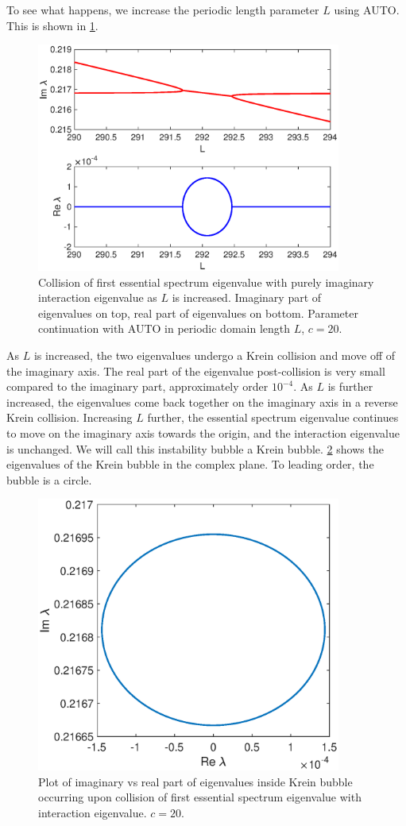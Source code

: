 \documentclass[thesis2.tex]{subfiles}
\begin{document}
To see what happens, we increase the periodic length parameter $L$ using AUTO. This is shown in \cref{fig:kreinbubble1}.
\begin{figure}
\includegraphics[width=10cm]{images/kdv5numerics/kreinbubble1}
\caption[Eigenvalue collisions for periodic double pulses in KdV5]{Collision of first essential spectrum eigenvalue with purely imaginary interaction eigenvalue as $L$ is increased. Imaginary part of eigenvalues on top, real part of eigenvalues on bottom. Parameter continuation with AUTO in periodic domain length $L$, $c = 20$.}
\label{fig:kreinbubble1}
\end{figure}
As $L$ is increased, the two eigenvalues undergo a Krein collision and move off of the imaginary axis. The real part of the eigenvalue post-collision is very small compared to the imaginary part, approximately order $10^{-4}$. As $L$ is further increased, the eigenvalues come back together on the imaginary axis in a reverse Krein collision. Increasing $L$ further, the essential spectrum eigenvalue continues to move on the imaginary axis towards the origin, and the interaction eigenvalue is unchanged. We will call this instability bubble a Krein bubble. \cref{fig:kreinbubble1zoom} shows the eigenvalues of the Krein bubble in the complex plane. To leading order, the bubble is a circle.
\begin{figure}
\includegraphics[width=10cm]{images/kdv5numerics/kreinbubble1zoom}
\caption[First Krein bubble for KdV5]{Plot of imaginary vs real part of eigenvalues inside Krein bubble occurring upon collision of first essential spectrum eigenvalue with interaction eigenvalue. $c = 20$.}
\label{fig:kreinbubble1zoom}
\end{figure}
\end{document}
